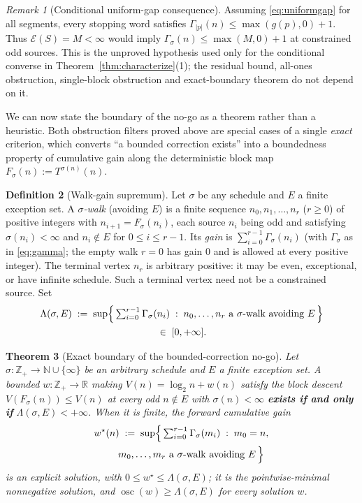 \documentclass[11pt]{amsart}
\newtheorem{theorem}{Theorem}[section]
\theoremstyle{definition}
\newtheorem{definition}[theorem]{Definition}
\theoremstyle{remark}
\newtheorem{remark}[theorem]{Remark}
\newcommand{\N}{\mathbb{N}}
\newcommand{\Z}{\mathbb{Z}}
\newcommand{\R}{\mathbb{R}}
\begin{document}
\begin{remark}[Conditional uniform-gap consequence]\label{cor:uniformgap}
Assuming \eqref{eq:uniformgap} for all segments, every stopping word satisfies $\Gamma_{|p|}(n)\le\max(g(p),0)+1$. Thus $\mathcal E(S)=M<\infty$ would imply $\Gamma_\sigma(n)\le\max(M,0)+1$ at constrained odd sources. This is the unproved hypothesis used only for the conditional converse in Theorem~\ref{thm:characterize}(1); the residual bound, all-ones obstruction, single-block obstruction and exact-boundary theorem do not depend on it.
\end{remark}

We can now state the boundary of the no-go as a theorem rather than a heuristic. Both obstruction filters proved above are special cases of a single \emph{exact} criterion, which converts ``a bounded correction exists'' into a boundedness property of cumulative gain along the deterministic block map $F_\sigma(n) := T^{\sigma(n)}(n)$.

\begin{definition}[Walk-gain supremum]\label{def:walkgain}
Let $\sigma$ be any schedule and $E$ a finite exception set. A \emph{$\sigma$-walk} (avoiding $E$) is a finite sequence $n_0, n_1, \dots, n_r$ ($r \ge 0$) of positive integers with $n_{i+1} = F_\sigma(n_i)$, each source $n_i$ being odd and satisfying $\sigma(n_i) < \infty$ and $n_i \notin E$ for $0 \le i \le r-1$. Its \emph{gain} is $\sum_{i=0}^{r-1} \Gamma_\sigma(n_i)$ (with $\Gamma_\sigma$ as in \eqref{eq:gamma}; the empty walk $r=0$ has gain $0$ and is allowed at every positive integer). The terminal vertex $n_r$ is arbitrary positive: it may be even, exceptional, or have infinite schedule. Such a terminal vertex need not be a constrained source. Set
\begin{multline*}
\Lambda(\sigma, E)
\;:=\;
\sup\Bigl\{\,
  \textstyle\sum_{i=0}^{r-1} \Gamma_\sigma(n_i)
  \;:\;
  n_0,\dots,n_r \text{ a $\sigma$-walk avoiding $E$}
\,\Bigr\} \\
\;\in\; [0, +\infty].
\end{multline*}
\end{definition}

\begin{theorem}[Exact boundary of the bounded-correction no-go]\label{thm:exactboundary}
Let $\sigma : \Z_+ \to \N \cup \{\infty\}$ be an arbitrary schedule and $E$ a finite exception set. A bounded $w : \Z_+ \to \R$ making $V(n) = \log_2 n + w(n)$ satisfy the block descent $V(F_\sigma(n)) \le V(n)$ at every odd $n \notin E$ with $\sigma(n) < \infty$ \textbf{exists if and only if} $\Lambda(\sigma, E) < +\infty$. When it is finite, the forward cumulative gain
\begin{multline*}
w^\star(n)
\;:=\;
\sup\Bigl\{\,
  \textstyle\sum_{i=0}^{r-1}\Gamma_\sigma(m_i)
  \;:\;
  m_0 = n,\\
  \qquad m_0,\dots,m_r \text{ a $\sigma$-walk avoiding $E$}
\,\Bigr\}
\end{multline*}
is an explicit solution, with $0 \le w^\star \le \Lambda(\sigma,E)$; it is the pointwise-minimal nonnegative solution, and $\operatorname{osc}(w) \ge \Lambda(\sigma,E)$ for every solution $w$.
\end{theorem}
\end{document}
